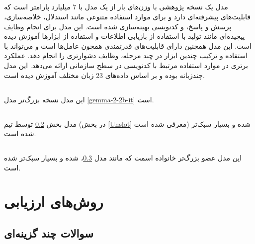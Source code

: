 \documentclass[11pt, a4paper, oneside]{book}
\begin{document}
			\subsection{} \label{c4ai-command-r7b}
			
				مدل  یک نسخه پژوهشی با وزن‌های باز از یک مدل با 7 میلیارد پارامتر است که قابلیت‌های پیشرفته‌ای دارد و برای موارد استفاده متنوعی مانند استدلال، خلاصه‌سازی، پرسش و پاسخ، و کدنویسی بهینه‌سازی شده است. این مدل برای انجام وظایف پیچیده‌ای مانند تولید با استفاده از بازیابی اطلاعات و استفاده از ابزارها آموزش دیده است.
				این مدل همچنین دارای قابلیت‌های قدرتمندی همچون عامل‌ها است و می‌تواند با استفاده و ترکیب چندین ابزار در چند مرحله، وظایف دشوارتری را انجام دهد.  عملکرد برتری در موارد استفاده مرتبط با کدنویسی در سطح سازمانی ارائه می‌دهد. این مدل چندزبانه بوده و بر اساس داده‌های 23 زبان مختلف آموزش دیده است.
		
			\subsection{} \label{gemma-2-9b-it}
				
				این مدل نسخه بزرگ‌تر مدل \ref{gemma-2-2b-it} است.
		
			\subsection{} \label{gemma-2-9b-it-bnb-4bit}
				
				مدل بخش \ref{gemma-2-9b-it} توسط تیم  (در بخش \ref{Unslot} معرفی شده است)  شده و بسیار سبک‌تر شده است.
			
			\subsection{} \label{gemma-2-27b-it-bnb-4bit}
				
				این مدل عضو بزرگ‌تر خانواده  اسمت که مانند مدل \ref{gemma-2-9b-it-bnb-4bit}،  شده و بسیار سبک‌تر شده است. 
		
		\section{ر‌وش‌های ارزیابی}
	
			\subsection{سوالات چند گزینه‌ای}
			
\end{document}
